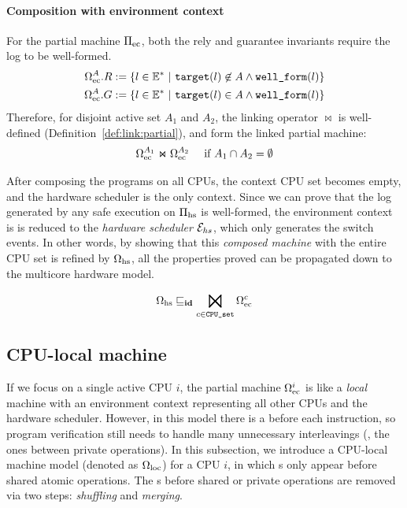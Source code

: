 \paragraph{Composition with environment context}
For the partial machine $\Pi_{\text{ec}}$,
both the rely and guarantee invariants
require the log to be well-formed.
\begin{align*}
\Omega_{\text{ec}}^A.R := \{ l \in \mathbb{E}^* \ |\ {{\texttt{target}}}(l) \not\in A
\land {\texttt{well\_form}}(l) \} \\
\Omega_{\text{ec}}^A.G := \{ l \in \mathbb{E}^* \ |\ {{\texttt{target}}}(l) \in A
\land {\texttt{well\_form}}(l) \}
\end{align*}
Therefore, for disjoint active set $A_1$ and $A_2$,
the linking operator $\Join$ is well-defined 
(\cf Definition~\ref{def:link:partial}),
and form the linked partial machine:
\[\Omega_{\text{ec}}^{A_1} \Join \Omega_{\text{ec}}^{A_2}
\quad \text{ if } A_1 \cap A_2 = \emptyset\]

After composing the programs on all CPUs, the context CPU set becomes
empty, and the hardware scheduler is the only context.
Since we can prove that the log generated
by any safe execution on $\Pi_{\text{hs}}$
is well-formed,
the environment context is  is
reduced to the \emph{hardware scheduler}
$\mathcal{E}_{hs}$, which only generates the
switch events. In other words, by
showing that this \emph{composed machine} with the entire CPU set
is refined by $\Omega_{\text{hs}}$, 
all the properties proved can be propagated down to the
multicore hardware model.

\begin{lemma}
\[\pmach{hs} \refines_\id \bigJoin_{c\in\comm{CPU\_set}}
\pmach{ec}^{c}\]
\end{lemma}


\subsection{CPU-local machine}
\label{subsec:spec:seq}
If we focus on a single active CPU $i$,
the partial machine $\Omega_{\text{ec}}^i$ is like a \emph{local} machine
with an environment context representing all other CPUs
and the hardware scheduler. However,
in this model there is a {\intptext} before each instruction,
so program verification still needs to handle many unnecessary 
interleavings (\eg, the ones between private operations).
In this subsection, we introduce a CPU-local
machine model (denoted as $\Omega_{\text{loc}}$) for a CPU $i$, in which {\intptext}s
only appear before shared atomic operations.
The {\intptext}s before shared or private operations
are removed via two steps: \emph{shuffling} and \emph{merging}.


